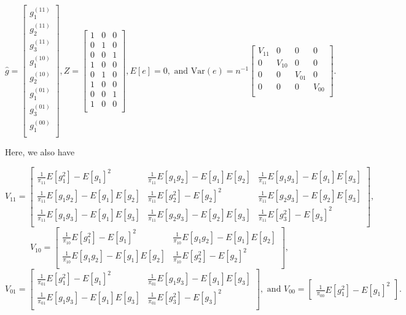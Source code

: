 \documentclass[
  letterpaper,
  DIV=11,
  numbers=noendperiod]{scrartcl}
\newcommand{\Var}{{\text{Var}}}
\begin{document}
\[\hat g = 
\begin{bmatrix}
g_1^{(11)} \\
g_2^{(11)} \\
g_3^{(11)} \\
g_1^{(10)} \\
g_2^{(10)} \\
g_1^{(01)} \\
g_3^{(01)} \\
g_1^{(00)} \\
\end{bmatrix},
Z = 
\begin{bmatrix}
1 & 0 & 0 \\
0 & 1 & 0 \\
0 & 0 & 1 \\
1 & 0 & 0 \\
0 & 1 & 0 \\
1 & 0 & 0 \\
0 & 0 & 1 \\
1 & 0 & 0 \\
\end{bmatrix},
E[e] = 0,
\text{ and } 
\Var(e) = n^{-1}
\begin{bmatrix}
V_{11} & 0 & 0 & 0 \\
0 & V_{10} & 0 & 0 \\
0 & 0 & V_{01} & 0 \\
0 & 0 & 0 & V_{00} \\
\end{bmatrix}.
\]

Here, we also have

\[
V_{11} = 
\begin{bmatrix}
\frac{1}{\pi_{11}} E[g_1^2] - E[g_1]^2 & \frac{1}{\pi_{11}} E[g_1g_2] -
E[g_1]E[g_2] & \frac{1}{\pi_{11}} E[g_1g_3] - E[g_1]E[g_3] \\
\frac{1}{\pi_{11}} E[g_1g_2] - E[g_1]E[g_2] & \frac{1}{\pi_{11}} E[g_2^2] -
E[g_2]^2 & \frac{1}{\pi_{11}} E[g_2g_3] - E[g_2]E[g_3] \\
\frac{1}{\pi_{11}} E[g_1g_3] - E[g_1]E[g_3] & \frac{1}{\pi_{11}} E[g_2g_3] -
E[g_2]E[g_3] & \frac{1}{\pi_{11}} E[g_3^2] - E[g_3]^2 \\
\end{bmatrix},
\] \[
V_{10} = 
\begin{bmatrix}
\frac{1}{\pi_{10}}E[g_1^2] - E[g_1]^2 & \frac{1}{\pi_{10}}E[g_1g_2] - E[g_1]E[g_2]\\
\frac{1}{\pi_{10}}E[g_1g_2] - E[g_1]E[g_2] & \frac{1}{\pi_{10}}E[g_2^2] - E[g_2]^2 \\
\end{bmatrix},
\] \[
V_{01} = 
\begin{bmatrix}
\frac{1}{\pi_{01}}E[g_1^2] - E[g_1]^2 & \frac{1}{\pi_{01}}E[g_1g_3] - E[g_1]E[g_3]\\
\frac{1}{\pi_{01}}E[g_1g_3] - E[g_1]E[g_3] & \frac{1}{\pi_{01}}E[g_3^2] - E[g_3]^2 \\
\end{bmatrix}, \text{ and }
V_{00} = 
\begin{bmatrix}
\frac{1}{\pi_{00}}E[g_1^2] - E[g_1]^2
\end{bmatrix}.
\]
\end{document}
